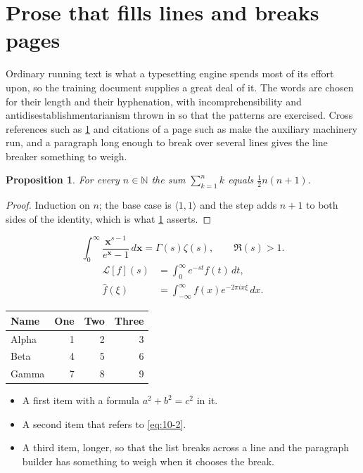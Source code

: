 \documentclass[11pt,a4paper]{report}
\theoremstyle{plain}
\newtheorem{proposition}{Proposition}[chapter]
\newcommand{\vecn}[1]{\mathbf{#1}}
\newcommand{\pairs}[2]{\langle #1,#2\rangle}
\begin{document}
\section{Prose that fills lines and breaks pages}
\label{sec:prose10-2}
Ordinary running text is what a typesetting engine spends most of its effort
upon, so the training document supplies a great deal of it. The words are
chosen for their length and their hyphenation, with incomprehensibility and
antidisestablishmentarianism thrown in so that the patterns are exercised.
Cross references such as \cref{sec:prose10-2} and citations of a page such
as \pageref{sec:prose10-2} make the auxiliary machinery run, and a
paragraph long enough to break over several lines gives the line breaker
something to weigh.
\begin{proposition}\label{prop:10-2}
For every $n\in\mathbb{N}$ the sum $\sum_{k=1}^{n}k$ equals
$\tfrac{1}{2}n(n+1)$.
\end{proposition}
\begin{proof}
Induction on $n$; the base case is $\pairs{1}{1}$ and the step adds $n+1$ to
both sides of the identity, which is what \cref{prop:10-2} asserts.
\end{proof}
\begin{equation}\label{eq:10-2}
  \int_{0}^{\infty}\frac{\vecn{x}^{s-1}}{e^{\vecn{x}}-1}\,d\vecn{x}
    = \Gamma(s)\zeta(s),\qquad \Re(s)>1 .
\end{equation}
\begin{align}
  \mathcal{L}[f](s) &= \int_{0}^{\infty} e^{-st} f(t)\,dt, \\
  \widehat{f}(\xi)  &= \int_{-\infty}^{\infty} f(x) e^{-2\pi i x\xi}\,dx .
\end{align}
\par\noindent\begin{center}
\begin{tabular}{lrrr}
\hline
Name & One & Two & Three \\
\hline
Alpha & 1 & 2 & 3 \\
Beta & 4 & 5 & 6 \\
Gamma & 7 & 8 & 9 \\
\hline
\end{tabular}
\end{center}
\begin{itemize}
  \item A first item with a formula $a^2+b^2=c^2$ in it.
  \item A second item that refers to \eqref{eq:10-2}.
  \item A third item, longer, so that the list breaks across a line and the
    paragraph builder has something to weigh when it chooses the break.
\end{itemize}
\end{document}
